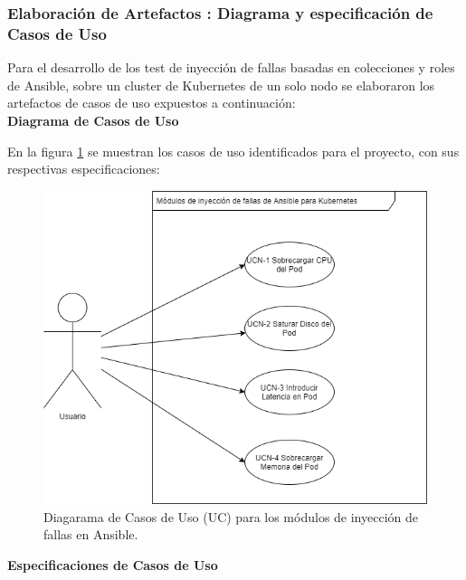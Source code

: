 \subsubsection{Elaboración de Artefactos : Diagrama y especificación de Casos de Uso}
\par Para el desarrollo de los test de inyección de fallas basadas en colecciones y roles de Ansible, sobre un cluster de Kubernetes de un solo nodo se elaboraron los artefactos de casos de uso expuestos a continuación:\\


\textbf{Diagrama de Casos de Uso}\\


\par En la figura \ref{fig:uc01} se muestran los casos de uso identificados para el proyecto, con sus respectivas especificaciones:

\begin{figure}[htpb!]
	\centering
	\includegraphics[width=0.795\columnwidth]{images/usecase/ucfaultinjectionF.png}
	\caption{Diagarama de Casos de Uso (UC) para los módulos de inyección de fallas en Ansible.}
	\label{fig:uc01}
\end{figure}

\textbf{Especificaciones de Casos de Uso}\\

